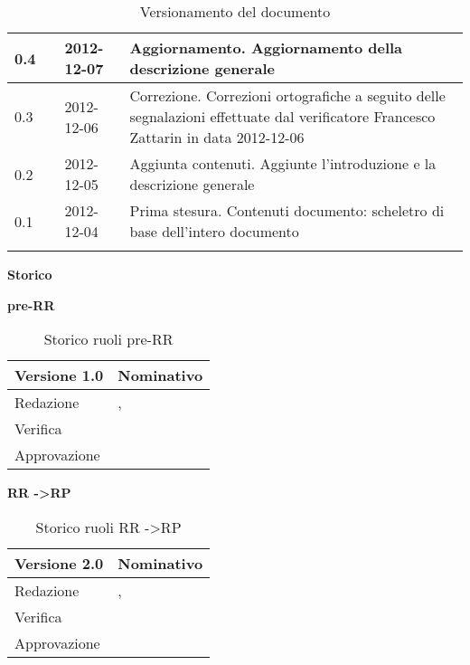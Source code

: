 \begin{longtable}{p{} p{} p{} p{}}
	    \midrule
	    	0.4 & 	\SL & 	2012-12-07  		& Aggiornamento. \newline Aggiornamento della descrizione generale \\
	    \midrule
	    	0.3 &	\SL & 	2012-12-06		& Correzione. \newline Correzioni ortografiche a seguito delle segnalazioni effettuate dal verificatore Francesco Zattarin in data 2012-12-06\\
	    \midrule
	    	0.2 &	\MB & 	2012-12-05		& Aggiunta contenuti. \newline Aggiunte l'introduzione e la descrizione generale \\
	    \midrule
		0.1 &	\SL&	2012-12-04		& Prima stesura. \newline Contenuti documento: scheletro di base dell'intero documento\\
	    \bottomrule

	\caption{Versionamento del documento}
	\end{longtable}

\newpage
	
\Large{\textbf{Storico }}\\
\normalsize

\textbf{pre-RR}

\begin{table}[h]
\begin{center}

\begin{tabular}{p{} p{}}
\toprule
\textbf{Versione 1.0}	&	\textbf{Nominativo}\\
\midrule
\midrule
Redazione	&	\MB, \SL \\
\midrule
Verifica &	\FZ	\\
\midrule
Approvazione	&	\DC	\\
\bottomrule
\end{tabular}
\caption{Storico ruoli pre-RR}
\label{tabVers1}
\end{center}
\end{table}


\textbf{RR -\textgreater RP}

\begin{table}[h]
\begin{center}

\begin{tabular}{p{} p{}}
\toprule
\textbf{Versione 2.0}	&	\textbf{Nominativo}\\
\midrule
\midrule
Redazione	&	\VP, \EZ \\
\midrule
Verifica &	\AB	\\
\midrule
Approvazione	&	\MB	\\
\bottomrule
\end{tabular}
\caption{Storico ruoli RR -\textgreater RP}
\label{tabVers2}
\end{center}
\end{table}



